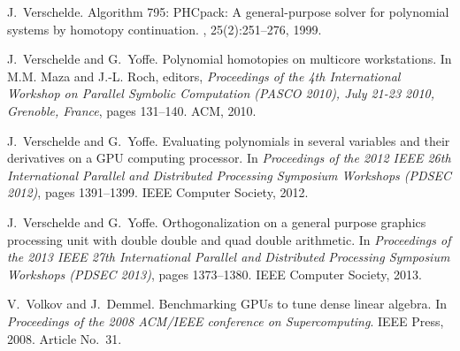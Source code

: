 \documentclass{article}
\begin{document}
\begin{thebibliography}{10}
J.~Verschelde.
\newblock Algorithm 795: {PHC}pack: A general-purpose solver for polynomial
  systems by homotopy continuation.
, 25(2):251--276, 1999.

J.~Verschelde and G.~Yoffe.
\newblock Polynomial homotopies on multicore workstations.
\newblock In M.M. Maza and J.-L. Roch, editors, {\em Proceedings of the 4th
  International Workshop on Parallel Symbolic Computation (PASCO 2010), July
  21-23 2010, Grenoble, France}, pages 131--140. ACM, 2010.

J.~Verschelde and G.~Yoffe.
\newblock Evaluating polynomials in several variables and their derivatives on
  a {GPU} computing processor.
\newblock In {\em Proceedings of the 2012 IEEE 26th International Parallel and
  Distributed Processing Symposium Workshops (PDSEC 2012)}, pages 1391--1399.
  IEEE Computer Society, 2012.

J.~Verschelde and G.~Yoffe.
\newblock Orthogonalization on a general purpose graphics processing unit with
  double double and quad double arithmetic.
\newblock In {\em Proceedings of the 2013 IEEE 27th International Parallel and
  Distributed Processing Symposium Workshops (PDSEC 2013)}, pages 1373--1380.
  IEEE Computer Society, 2013.

V.~Volkov and J.~Demmel.
\newblock Benchmarking {GPU}s to tune dense linear algebra.
\newblock In {\em Proceedings of the 2008 ACM/IEEE conference on
  Supercomputing}. IEEE Press, 2008.
\newblock Article No.\ 31.

\end{thebibliography}
\end{document}
